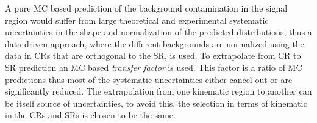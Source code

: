 A pure MC based prediction of the background contamination in the signal region
would suffer from large theoretical and experimental systematic uncertainties in
the shape and normalization of the predicted distributions, thus a data driven
approach, where the different backgrounds are normalized using the data in CRs
that are orthogonal to the SR, is used. To extrapolate from CR to SR prediction
an MC based \emph{transfer factor} is used. This factor is a ratio of MC
predictions thus most of the systematic uncertainties either cancel out or are
significantly reduced. The extrapolation from one kinematic region to another
can be itself source of uncertainties, to avoid this, the selection in terms of
kinematic in the CRs and SRs is chosen to be the same.
